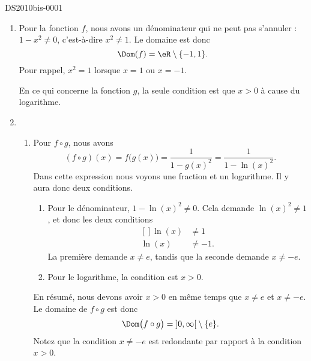
\begin{corrige}{DS2010bis-0001}

	\begin{enumerate}
		\item
			Pour la fonction  $f$, nous avons un dénominateur qui ne peut pas s'annuler : $1-x^2\neq 0$, c'est-à-dire $x^2\neq 1$. Le domaine est donc 
			\begin{equation}
				\Dom(f)=\eR\setminus\{ -1,1 \}.
			\end{equation}
			Pour rappel, $x^2=1$ lorsque $x=1$ ou $x=-1$.

			En ce qui concerne la fonction $g$, la seule condition est que $x>0$ à cause du logarithme.
		\item
			\begin{enumerate}
				\item
					Pour $f\circ g$, nous avons
					\begin{equation}
						(f\circ g)(x)=f\big( g(x) \big)=\frac{1}{ 1-g(x)^2 }=\frac{1}{ 1-\ln(x)^2 }.
					\end{equation}
					Dans cette expression nous voyons une fraction et un logarithme. Il y aura donc deux conditions.
					\begin{enumerate}
						\item
							Pour le dénominateur, $1-\ln(x)^2\neq 0$. Cela demande $\ln(x)^2\neq 1$, et donc les deux conditions
							\begin{equation}
								\begin{aligned}[]
									\ln(x)&\neq 1\\
									\ln(x)&\neq -1.
								\end{aligned}
							\end{equation}
							La première demande $x\neq e$, tandis que la seconde demande $x\neq -e$.
						\item
							Pour le logarithme, la condition est $x>0$.
					\end{enumerate}
					En résumé, nous devons avoir $x>0$ en même temps que $x\neq e$ et $x\neq -e$. Le domaine de $f\circ g$ est donc
					\begin{equation}
						\Dom\big( f\circ g \big)=\mathopen] 0 , \infty \mathclose[\setminus\{ e \}.
					\end{equation}
					Notez que la condition $x\neq -e$ est redondante par rapport à la condition $x>0$.


\end{enumerate}
\end{enumerate}
\end{corrige}
